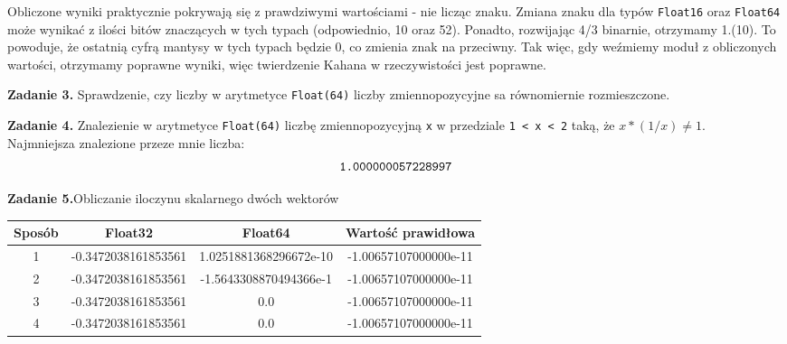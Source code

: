 \documentclass[15pt, a4paper]{article}
\begin{document}

Obliczone wyniki praktycznie pokrywają się z prawdziwymi wartościami - nie licząc znaku. Zmiana znaku dla typów \verb|Float16| oraz \verb|Float64| może wynikać z ilości bitów znaczących w tych typach (odpowiednio, 10 oraz 52). Ponadto, rozwijając 4/3 binarnie, otrzymamy 1.(10). To powoduje, że ostatnią cyfrą mantysy w tych typach będzie 0, co zmienia znak na przeciwny. Tak więc, gdy weźmiemy moduł z obliczonych wartości, otrzymamy poprawne wyniki, więc twierdzenie Kahana w rzeczywistości jest poprawne.

\vspace{0.5cm}

\noindent\hrulefill


\vspace{0.5cm}

\noindent\textbf{Zadanie 3.} Sprawdzenie, czy liczby w arytmetyce \verb|Float(64)| liczby zmiennopozycyjne sa równomiernie rozmieszczone.

\vspace{0.5cm}

\noindent\hrulefill


\vspace{0.5cm}

\noindent\textbf{Zadanie 4.} Znalezienie w arytmetyce \verb|Float(64)| liczbę zmiennopozycyjną \verb|x| w przedziale \verb|1 < x < 2| taką, że $x * (1/x) \neq 1$.
\\
Najmniejsza znalezione przeze mnie liczba: \[\verb|1.000000057228997|\]

\vspace{0.5cm}

\noindent\hrulefill


\vspace{0.5cm}

\noindent\textbf{Zadanie 5.}Obliczanie iloczynu skalarnego dwóch wektorów

\begin{table}[ht]
    \begin{tabular}{|c|c|c|c|}
        \hline 
        Sposób & Float32 & Float64 & Wartość prawidłowa \\ \hline
        1 & -0.3472038161853561 & 1.0251881368296672e-10 & -1.00657107000000e-11 \\ \hline
        2 & -0.3472038161853561 & -1.5643308870494366e-1 & -1.00657107000000e-11 \\ \hline
        3 & -0.3472038161853561 & 0.0 & -1.00657107000000e-11  \\ \hline
        4 & -0.3472038161853561 & 0.0 & -1.00657107000000e-11 \\ \hline
    \end{tabular}
    \label{tab:macheps}
\end{table}
\end{document}
